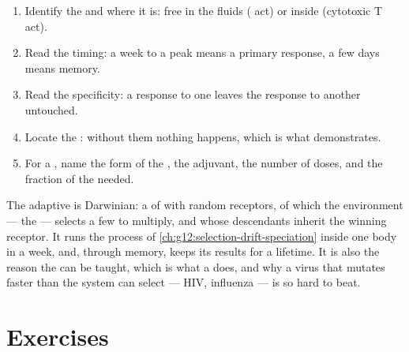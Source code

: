\begin{method}\label{met:g12:adaptive-immunity:read}
\begin{enumerate}
  \item Identify the  and where it is: free in the fluids
        ( act) or inside  (cytotoxic T  act).
  \item Read the timing: a week to a peak means a primary response, a
        few days means memory.
  \item Read the specificity: a response to one  leaves the
        response to another untouched.
  \item Locate the : without them nothing happens, which
        is what  demonstrates.
  \item For a , name the form of the , the adjuvant, the
        number of doses, and the fraction of the  needed.
\end{enumerate}
\end{method}

\begin{remark}\label{rem:g12:adaptive-immunity:selection}
The adaptive  is Darwinian: a  of  with
random receptors, of which the environment --- the  --- selects
a few to multiply, and whose descendants inherit the winning
receptor. It runs the process of \cref{ch:g12:selection-drift-speciation}
inside one body in a week, and, through memory, keeps its results for
a lifetime. It is also the reason the  can be taught,
which is what a  does, and why a virus that mutates faster
than the system can select --- HIV, influenza --- is so hard to beat.
\end{remark}

\section{Exercises}

